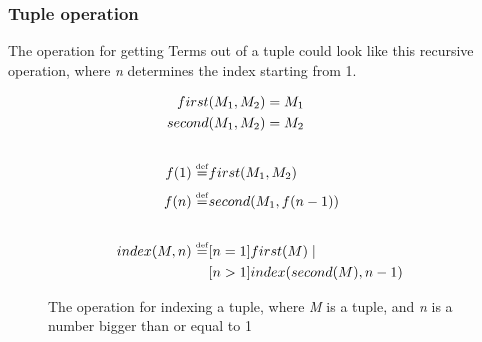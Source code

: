 \subsubsection{Tuple operation}
The operation for getting Terms out of a tuple could look like this recursive operation, where \textit{n} determines the index starting from 1.
\begin{figure}[h]
    \begin{center}
        \begin{align*}
            first&(M_1, M_2) = M_1\\
            second&(M_1, M_2) = M_2\\
            \\
            f(1) \overset{\underset{\mathrm{def}}{}}{=} & first(M_1, M_2)\\
            f(n) \overset{\underset{\mathrm{def}}{}}{=} & second(M_1, f(n-1))\\
            \\
            index(M, n) \overset{\underset{\mathrm{def}}{}}{=} &[n = 1]first(M)\mid \\
            &[n > 1]index(second(M), n-1)
        \end{align*}
    \end{center}
    \caption{The operation for indexing a tuple, where \textit{M} is a tuple, and \textit{n} is a number bigger than  or equal to 1}
\end{figure}
\FloatBarrier
